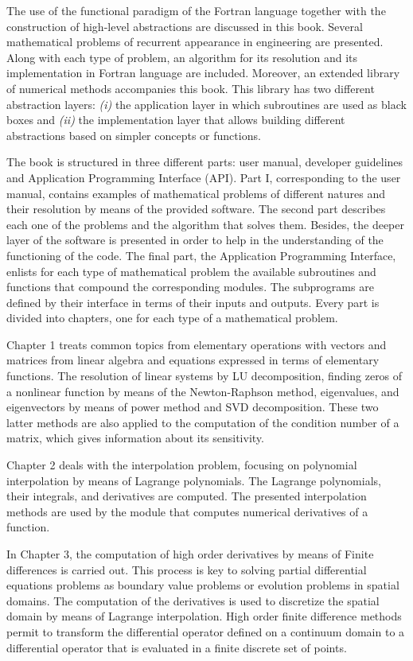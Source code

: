 The use of the functional paradigm of the Fortran language together with the construction of high-level abstractions are discussed in this book. Several mathematical problems of recurrent appearance in engineering are presented. Along with each type of problem, an algorithm for its resolution and its implementation in Fortran language are included. 
Moreover, an extended library of numerical methods accompanies this book. 
This library has two different abstraction layers: {\it (i)} the application layer
in which subroutines are used as black boxes and {\it (ii)} the implementation layer
that allows building different abstractions based on simpler concepts or functions.  

The book is structured in three different parts:  user manual, developer guidelines and Application Programming Interface (API). 
Part I, corresponding to the user manual, contains examples of mathematical problems of different natures and their resolution by means of the provided software. 
The second part describes each one of the problems and the algorithm that solves them. 
Besides, the deeper layer of the software is presented in order to help in the understanding of the functioning of the code. The final part, the Application Programming Interface, enlists for each type of mathematical problem the available subroutines and functions that compound the corresponding modules. The subprograms are defined by their interface in terms of their inputs and outputs. Every part is divided into chapters, one for each type of a mathematical problem. 

Chapter 1 treats common topics from elementary operations with vectors and matrices from linear algebra and equations expressed in terms of elementary functions. 
The resolution of linear systems by LU decomposition, finding zeros of a nonlinear function by means of the Newton-Raphson method, eigenvalues, and eigenvectors by means of power method and SVD decomposition. These two latter methods are also applied to the computation of the condition number of a matrix, which gives information about its sensitivity. 

Chapter 2 deals with the interpolation problem, focusing on polynomial interpolation by means of Lagrange polynomials. 
The Lagrange polynomials, their integrals, and derivatives are computed. 
The presented interpolation methods are used by the module that computes numerical derivatives of a function. 

In Chapter 3, the computation of high order derivatives by means of Finite differences is carried out. 
This process is key to solving partial differential equations problems as boundary value problems or evolution problems in spatial domains. 
The computation of the derivatives is used to discretize the spatial domain by means of Lagrange interpolation. High order finite difference methods permit to transform the differential operator defined on a continuum domain to a differential operator that is evaluated in a finite discrete set of points. 


